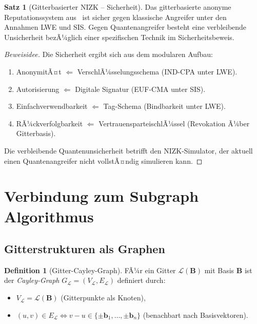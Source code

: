 ﻿\documentclass[a4paper,12pt]{article}
\theoremstyle{definition}
\newtheorem{definition}{Definition}
\newtheorem{satz}{Satz}
\newcommand{\Lat}{\mathcal{L}}
\newcommand{\B}{\mathbf{B}}
\begin{document}
\begin{satz}[Gitterbasierter NIZK -- Sicherheit]
\label{satz:nizk}
Das gitterbasierte anonyme Reputationssystem aus~\cite{BBP23} ist sicher gegen
klassische Angreifer unter den Annahmen LWE und SIS.
Gegen Quantenangreifer besteht eine verbleibende Unsicherheit bezÃ¼glich einer
spezifischen Technik im Sicherheitsbeweis.
\end{satz}

\begin{proof}[Beweisidee]
Die Sicherheit ergibt sich aus dem modularen Aufbau:
\begin{enumerate}
    \item AnonymitÃ¤t $\Leftarrow$ VerschlÃ¼sselungsschema (IND-CPA unter LWE).
    \item Autorisierung $\Leftarrow$ Digitale Signatur (EUF-CMA unter SIS).
    \item Einfachverwendbarkeit $\Leftarrow$ Tag-Schema (Bindbarkeit unter LWE).
    \item RÃ¼ckverfolgbarkeit $\Leftarrow$ VertrauensparteischlÃ¼ssel (Revokation Ã¼ber Gitterbasis).
\end{enumerate}
Die verbleibende Quantenunsicherheit betrifft den NIZK-Simulator,
der aktuell einen Quantenangreifer nicht vollstÃ¤ndig simulieren kann.
\end{proof}

\section{Verbindung zum Subgraph Algorithmus}

\subsection{Gitterstrukturen als Graphen}

\begin{definition}[Gitter-Cayley-Graph]
FÃ¼r ein Gitter $\Lat(\B)$ mit Basis $\B$ ist der \emph{Cayley-Graph}
$G_\Lat = (V_\Lat, E_\Lat)$ definiert durch:
\begin{itemize}
    \item $V_\Lat = \Lat(\B)$ (Gitterpunkte als Knoten),
    \item $(u, v) \in E_\Lat \iff v - u \in \{\pm \mathbf{b}_1, \ldots, \pm \mathbf{b}_n\}$ (benachbart nach Basisvektoren).
\end{itemize}
\end{definition}
\end{document}
